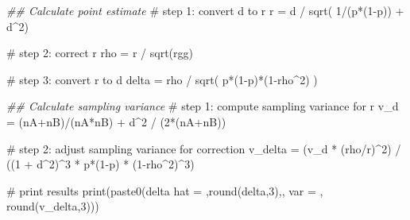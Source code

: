 \documentclass[
  letterpaper,
  DIV=11,
  numbers=noendperiod]{scrreprt}
\newenvironment{Shaded}{\begin{snugshade}}{\end{snugshade}}
\newcommand{\CommentTok}[1]{\textcolor[rgb]{0.37,0.37,0.37}{#1}}
\newcommand{\DecValTok}[1]{\textcolor[rgb]{0.68,0.00,0.00}{#1}}
\newcommand{\DocumentationTok}[1]{\textcolor[rgb]{0.37,0.37,0.37}{\textit{#1}}}
\newcommand{\FunctionTok}[1]{\textcolor[rgb]{0.28,0.35,0.67}{#1}}
\newcommand{\NormalTok}[1]{\textcolor[rgb]{0.00,0.23,0.31}{#1}}
\newcommand{\OtherTok}[1]{\textcolor[rgb]{0.00,0.23,0.31}{#1}}
\newcommand{\SpecialCharTok}[1]{\textcolor[rgb]{0.37,0.37,0.37}{#1}}
\newcommand{\StringTok}[1]{\textcolor[rgb]{0.13,0.47,0.30}{#1}}
\begin{document}
\begin{Shaded}
\begin{Highlighting}[]
\DocumentationTok{\#\# Calculate point estimate}
\CommentTok{\# step 1: convert d to r}
\NormalTok{r }\OtherTok{=}\NormalTok{ d }\SpecialCharTok{/} \FunctionTok{sqrt}\NormalTok{( }\DecValTok{1}\SpecialCharTok{/}\NormalTok{(p}\SpecialCharTok{*}\NormalTok{(}\DecValTok{1}\SpecialCharTok{{-}}\NormalTok{p)) }\SpecialCharTok{+}\NormalTok{ d}\SpecialCharTok{\^{}}\DecValTok{2}\NormalTok{)}

\CommentTok{\# step 2: correct r}
\NormalTok{rho }\OtherTok{=}\NormalTok{ r }\SpecialCharTok{/} \FunctionTok{sqrt}\NormalTok{(rgg)}

\CommentTok{\# step 3: convert r to d}
\NormalTok{delta }\OtherTok{=}\NormalTok{ rho }\SpecialCharTok{/} \FunctionTok{sqrt}\NormalTok{( p}\SpecialCharTok{*}\NormalTok{(}\DecValTok{1}\SpecialCharTok{{-}}\NormalTok{p)}\SpecialCharTok{*}\NormalTok{(}\DecValTok{1}\SpecialCharTok{{-}}\NormalTok{rho}\SpecialCharTok{\^{}}\DecValTok{2}\NormalTok{) )}

\DocumentationTok{\#\# Calculate sampling variance}
\CommentTok{\# step 1: compute sampling variance for r}
\NormalTok{v\_d }\OtherTok{=}\NormalTok{ (nA}\SpecialCharTok{+}\NormalTok{nB)}\SpecialCharTok{/}\NormalTok{(nA}\SpecialCharTok{*}\NormalTok{nB) }\SpecialCharTok{+}\NormalTok{ d}\SpecialCharTok{\^{}}\DecValTok{2} \SpecialCharTok{/}\NormalTok{ (}\DecValTok{2}\SpecialCharTok{*}\NormalTok{(nA}\SpecialCharTok{+}\NormalTok{nB))}

\CommentTok{\# step 2: adjust sampling variance for correction}
\NormalTok{v\_delta }\OtherTok{=}\NormalTok{ (v\_d }\SpecialCharTok{*}\NormalTok{ (rho}\SpecialCharTok{/}\NormalTok{r)}\SpecialCharTok{\^{}}\DecValTok{2}\NormalTok{) }\SpecialCharTok{/}\NormalTok{ ((}\DecValTok{1} \SpecialCharTok{+}\NormalTok{ d}\SpecialCharTok{\^{}}\DecValTok{2}\NormalTok{)}\SpecialCharTok{\^{}}\DecValTok{3} \SpecialCharTok{*}\NormalTok{ p}\SpecialCharTok{*}\NormalTok{(}\DecValTok{1}\SpecialCharTok{{-}}\NormalTok{p) }\SpecialCharTok{*}\NormalTok{ (}\DecValTok{1}\SpecialCharTok{{-}}\NormalTok{rho}\SpecialCharTok{\^{}}\DecValTok{2}\NormalTok{)}\SpecialCharTok{\^{}}\DecValTok{3}\NormalTok{)}

\CommentTok{\# print results}
\FunctionTok{print}\NormalTok{(}\FunctionTok{paste0}\NormalTok{(}\StringTok{\textquotesingle{}delta hat = \textquotesingle{}}\NormalTok{,}\FunctionTok{round}\NormalTok{(delta,}\DecValTok{3}\NormalTok{),}\StringTok{\textquotesingle{},  var = \textquotesingle{}}\NormalTok{, }\FunctionTok{round}\NormalTok{(v\_delta,}\DecValTok{3}\NormalTok{)))}
\end{Highlighting}
\end{Shaded}
\end{document}
